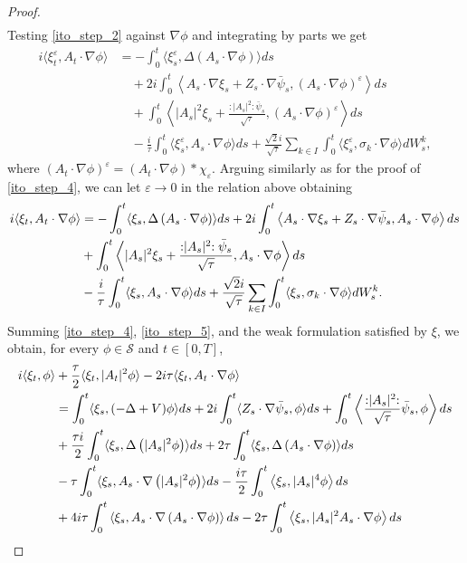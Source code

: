 \documentclass[a4paper,10pt]{amsart}
\renewcommand{\epsilon}{\varepsilon}
\newcommand{\wick}[1]{:\mathrel{#1}:}
\theoremstyle{remark}
\numberwithin{equation}{section}
\begin{document}
\begin{proof}
\begin{align}
   \end{align}
   Testing \eqref{ito_step_2} against $\nabla\phi$ and integrating by parts we get
	   \begin{align*}
	       i\langle\xi^{\epsilon}_t,A_t\cdot\nabla\phi\rangle
	       &=-\int_0^t
	       \langle\xi^{\epsilon}_s,\Delta(A_s\cdot\nabla\phi)\rangle ds\\
	       &\quad+2i\int_0^t
	       \left\langle A_s\cdot\nabla\xi_s+Z_s\cdot\nabla\bar{\psi}_s,
	       (A_s\cdot\nabla\phi)^{\epsilon}\right\rangle ds\\
	       &\quad+\int_0^t\left\langle |A_s|^2\xi_s
	       +\frac{\wick{|A_s|^2}\bar{\psi}_s}{\sqrt{\tau}},
	       (A_s\cdot\nabla\phi)^{\epsilon}\right\rangle ds\\
	       &\quad-\frac{i}{\tau}\int_0^t
	       \langle \xi^{\epsilon}_s,A_s\cdot\nabla\phi\rangle ds+\frac{\sqrt{2}i}{\sqrt{\tau}}\sum_{k\in I}\int_0^t
	       \langle \xi^{\epsilon}_s,\sigma_k\cdot\nabla\phi\rangle dW^k_s,
   \end{align*}
    where $(A_t\cdot\nabla\phi)^{\epsilon}=(A_t\cdot\nabla\phi)\ast \chi_{\epsilon}.$
Arguing similarly as for the proof of \eqref{ito_step_4}, we can let $\epsilon\rightarrow 0$ in the relation above obtaining
\begin{align}\label{ito_step_5}
    i\langle   \xi_t, A_t\cdot\nabla \phi\rangle&=-\int_0^t\langle\xi_s,\Delta\left(A_s\cdot\nabla \phi\right)\rangle ds  +2i\int_0^t\left\langle A_s\cdot\nabla\xi_s+Z_s \cdot\nabla \bar{\psi}_s, A_s\cdot\nabla\phi\right\rangle ds \notag
     \\& +\int_0^t\left\langle |A_s|^2\xi_s+\frac{\wick{|A_s|^2}\bar{\psi}_s}{\sqrt{\tau}}, A_s\cdot\nabla\phi\right\rangle ds\notag\\ & -\frac{i}{\tau}\int_0^t \langle \xi_s,A_s\cdot\nabla\phi\rangle ds+\frac{\sqrt{2}i}{\sqrt{\tau}}\sum_{k\in I }\int_0^t  \langle \xi_s,  \sigma_k\cdot\nabla\phi\rangle dW^k_s. 
\end{align}
Summing \eqref{ito_step_4}, \eqref{ito_step_5}, and the weak formulation
satisfied by $\xi$, we obtain, for every $\phi\in\mathscr{S}$ and
$t\in[0,T]$,
\begin{align*}
    i\langle \xi_t, \phi\rangle&+\frac{\tau}{2}\langle \xi_t,|A_t|^2\phi\rangle-2i\tau\langle \xi_t, A_t\cdot\nabla \phi\rangle\\ & =\int_0^t \langle \xi_s, (-\Delta+V)\phi\rangle ds+2i\int_0^t \langle Z_s\cdot\nabla\bar{\psi}_s,\phi\rangle ds +\int_0^t \left\langle \frac{\wick{|A_s|^2}}{\sqrt{\tau}}\bar{\psi}_s, \phi\right\rangle ds \\ & +\frac{\tau i}{2}\int_0^t\langle\xi_s,\Delta\left(|A_s|^2 \phi\right)\rangle ds+2\tau\int_0^t\langle\xi_s,\Delta\left(A_s\cdot\nabla \phi\right)\rangle ds\\& -\tau\int_0^t \langle \xi_s, A_s\cdot\nabla\left(|A_s|^2\phi\right)\rangle ds -\frac{i\tau}{2}\int_0^t\left\langle \xi_s,  |A_s|^4\phi\right\rangle ds\\ & +4i\tau\int_0^t\left\langle \xi_s, A_s\cdot\nabla\left(A_s\cdot\nabla\phi\right)\right\rangle ds -2\tau\int_0^t\left\langle \xi_s, |A_s|^2 A_s\cdot\nabla\phi\right\rangle ds\notag\\ 

\end{align*}
\end{proof}
\end{document}

